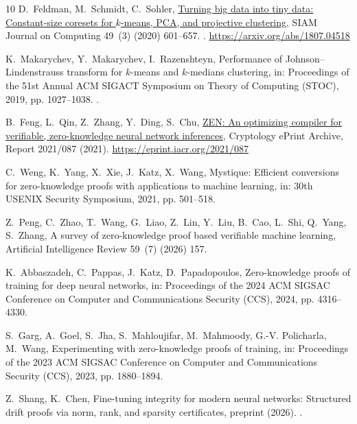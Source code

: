 \documentclass[5p,times,twocolumn]{elsarticle}
\begin{document}
\begin{thebibliography}{10}
D.~Feldman, M.~Schmidt, C.~Sohler,
  \href{https://arxiv.org/abs/1807.04518}{Turning big data into tiny data:
  Constant-size coresets for $k$-means, {PCA}, and projective clustering}, SIAM
  Journal on Computing 49~(3) (2020) 601--657.
\newblock \href {https://doi.org/10.1137/18M1209854}
  {}.
\newline\urlprefix\url{https://arxiv.org/abs/1807.04518}

K.~Makarychev, Y.~Makarychev, I.~Razenshteyn, Performance of {Johnson--Lindenstrauss} transform for $k$-means and $k$-medians clustering, in: Proceedings of the 51st Annual ACM SIGACT Symposium on Theory of Computing (STOC), 2019, pp. 1027--1038. \newblock \href {https://doi.org/10.1145/3313276.3316350} {}.


B.~Feng, L.~Qin, Z.~Zhang, Y.~Ding, S.~Chu,
  \href{https://eprint.iacr.org/2021/087}{{ZEN}: An optimizing compiler for
  verifiable, zero-knowledge neural network inferences}, Cryptology ePrint
  Archive, Report 2021/087 (2021).
\newline\urlprefix\url{https://eprint.iacr.org/2021/087}

C.~Weng, K.~Yang, X.~Xie, J.~Katz, X.~Wang, {Mystique}: Efficient conversions for zero-knowledge proofs with applications to machine learning, in: 30th USENIX Security Symposium, 2021, pp. 501--518.

Z.~Peng, C.~Zhao, T.~Wang, G.~Liao, Z.~Lin, Y.~Liu, B.~Cao, L.~Shi, Q.~Yang, S.~Zhang, A survey of zero-knowledge proof based verifiable machine learning, Artificial Intelligence Review 59~(7) (2026) 157.


K.~Abbaszadeh, C.~Pappas, J.~Katz, D.~Papadopoulos, Zero-knowledge proofs of training for deep neural networks, in: Proceedings of the 2024 ACM SIGSAC Conference on Computer and Communications Security (CCS), 2024, pp. 4316--4330.

S.~Garg, A.~Goel, S.~Jha, S.~Mahloujifar, M.~Mahmoody, G.-V. Policharla, M.~Wang, Experimenting with zero-knowledge proofs of training, in: Proceedings of the 2023 ACM SIGSAC Conference on Computer and Communications Security (CCS), 2023, pp. 1880--1894.

Z.~Shang, K.~Chen, Fine-tuning integrity for modern neural networks: Structured
  drift proofs via norm, rank, and sparsity certificates, preprint (2026).
\newblock \href {http://arxiv.org/abs/2604.04738} {}.


\end{thebibliography}
\end{document}
